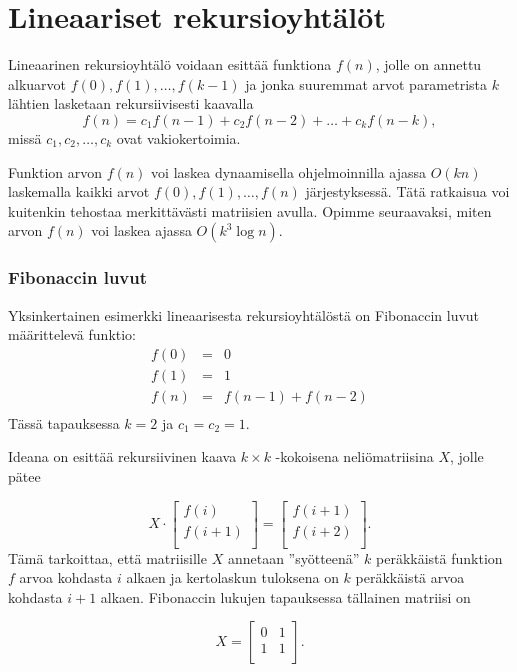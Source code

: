 \section{Lineaariset rekursioyhtälöt}

Lineaarinen rekursioyhtälö 
voidaan esittää funktiona $f(n)$,
jolle on annettu alkuarvot
$f(0),f(1),\ldots,f(k-1)$
ja jonka suuremmat arvot
parametrista $k$ lähtien lasketaan
rekursiivisesti kaavalla
\[f(n) = c_1 f(n-1) + c_2 f(n-2) + \ldots + c_k f (n-k),\]
missä $c_1,c_2,\ldots,c_k$ ovat vakiokertoimia.

Funktion arvon $f(n)$ voi laskea dynaamisella
ohjelmoinnilla ajassa $O(kn)$
laskemalla kaikki arvot $f(0),f(1),\ldots,f(n)$ järjestyksessä.
Tätä ratkaisua voi kuitenkin tehostaa merkittävästi
matriisien avulla.
Opimme seuraavaksi, miten arvon $f(n)$
voi laskea ajassa $O(k^3 \log n)$.

\subsubsection{Fibonaccin luvut}

Yksinkertainen esimerkki lineaarisesta rekursioyhtälöstä
on Fibonaccin luvut määrittelevä funktio:
\[
\begin{array}{lcl}
f(0) & = & 0 \\
f(1) & = & 1 \\
f(n) & = & f(n-1)+f(n-2) \\
\end{array}
\]
Tässä tapauksessa $k=2$ ja $c_1=c_2=1$.

Ideana on esittää rekursiivinen kaava $k \times k$
-kokoisena neliömatriisina $X$, jolle pätee

\[ X \cdot
 \begin{bmatrix}
  f(i) \\
  f(i+1) \\
 \end{bmatrix}
=
 \begin{bmatrix}
  f(i+1) \\
  f(i+2) \\
 \end{bmatrix}.
 \]
Tämä tarkoittaa, että matriisille $X$ annetaan
''syötteenä'' $k$ peräkkäistä funktion $f$ arvoa
kohdasta $i$ alkaen ja kertolaskun tuloksena
on $k$ peräkkäistä arvoa kohdasta $i+1$ alkaen.
Fibonaccin lukujen tapauksessa tällainen matriisi on

\[ X = 
 \begin{bmatrix}
  0 & 1 \\
  1 & 1 \\
 \end{bmatrix}.
\]

